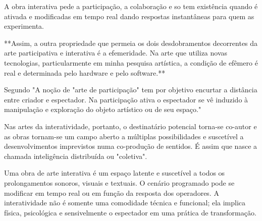 A obra interativa pede a participação, a colaboração e so tem existência quando é ativada e modificadas em tempo real dando respostas instantâneas para quem as experimenta.  \cite[p.22]{domingues}				
				
				
**Assim, a outra propriedade que permeia os dois desdobramentos decorrentes da arte participativa e interativa é a efemeridade. Na arte que utiliza novas tecnologias, particularmente em minha pesquisa artística, a condição de efêmero é real e determinada pelo hardware e pelo software.**

Segundo  "A noção de "arte de participação" tem por objetivo encurtar a distância entre criador e espectador. Na participação ativa o espectador se vê induzido à manipulação e exploração do objeto artístico ou de seu espaço."		
							
Nas artes da interatividade, portanto, o destinatário potencial torna-se co-autor e as obras tornam-se um campo aberto a múltiplas possibilidades e suscetível a desenvolvimentos imprevistos numa co-produção de sentidos. É assim que nasce a chamada inteligência distribuída ou "coletiva".  \cite[p. 20]{plaza}			
						
Uma obra de arte interativa é um espaço latente e suscetível a todos os prolongamentos sonoros, visuais e textuais. O cenário programado pode se modificar em tempo real ou em função da resposta dos operadores. A interatividade não é somente uma comodidade técnica e funcional; ela implica física, psicológica e sensivelmente o espectador em uma prática de transformação.  \cite[p. 20]{plaza}



